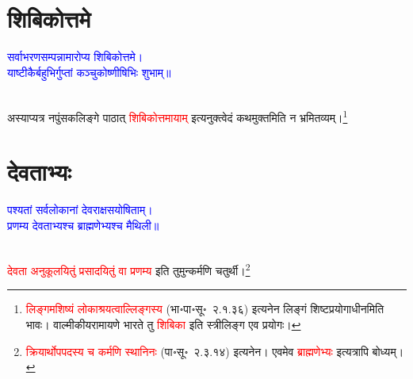 \section[शिबिकोत्तमे]{शिबिकोत्तमे}
\centering\textcolor{blue}{सर्वाभरणसम्पन्नामारोप्य शिबिकोत्तमे।\nopagebreak\\
याष्टीकैर्बहुभिर्गुप्तां कञ्चुकोष्णीषिभिः शुभाम्॥}\nopagebreak\\
\\
\begin{sloppypar}\justifying\noindent\hspace{10mm} अस्याप्यत्र नपुंसक\-लिङ्गे पाठात् \textcolor{red}{शिबिकोत्तमायाम्‌} इत्यनुक्त्वेदं कथमुक्तमिति न भ्रमितव्यम्।\footnote{\textcolor{red}{लिङ्गमशिष्यं लोकाश्रयत्वाल्लिङ्गस्य} (भा॰पा॰सू॰~२.१.३६) इत्यनेन लिङ्गं शिष्ट\-प्रयोगाधीनमिति भावः। वाल्मीकीय\-रामायणे भारते तु \textcolor{red}{शिबिका} इति स्त्रीलिङ्ग एव प्रयोगः।}\end{sloppypar}
\section[देवताभ्यः]{देवताभ्यः}
\centering\textcolor{blue}{पश्यतां सर्वलोकानां देवराक्षसयोषिताम्।\nopagebreak\\
प्रणम्य देवताभ्यश्च ब्राह्मणेभ्यश्च मैथिली॥}\nopagebreak\\
\\
\begin{sloppypar}\justifying\noindent\hspace{10mm} \textcolor{red}{देवता अनुकूलयितुं प्रसादयितुं वा प्रणम्य} इति तुमुन्कर्मणि चतुर्थी।\footnote{\textcolor{red}{क्रियार्थोपपदस्य च कर्मणि स्थानिनः} (पा॰सू॰~२.३.१४) इत्यनेन। एवमेव \textcolor{red}{ ब्राह्मणेभ्यः} इत्यत्रापि बोध्यम्।}\end{sloppypar}
